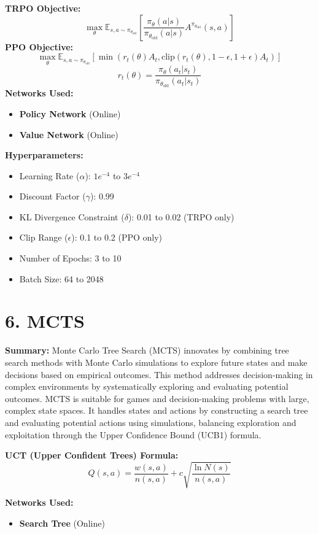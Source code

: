 \documentclass[a4paper,10pt]{article}
\begin{document}
\begin{multicols}{2}
\noindent \textbf{TRPO Objective:}
\[
\max_\theta \mathbb{E}_{s, a \sim \pi_{\theta_{\text{old}}}} \left[ \frac{\pi_\theta(a|s)}{\pi_{\theta_{\text{old}}}(a|s)} A^{\pi_{\theta_{\text{old}}}}(s, a) \right]
\]
\textbf{PPO Objective:}
\[
\max_\theta \mathbb{E}_{s, a \sim \pi_{\theta_{\text{old}}}} \left[ \min\left( r_t(\theta) A_t, \text{clip}(r_t(\theta), 1-\epsilon, 1+\epsilon) A_t \right) \right]
\]
\[
r_t(\theta) = \frac{\pi_\theta(a_t | s_t)}{\pi_{\theta_{\text{old}}}(a_t | s_t)}
\]
\textbf{Networks Used:}
\begin{itemize}
    \item \textbf{Policy Network} (Online)
    \item \textbf{Value Network} (Online)
\end{itemize}
\textbf{Hyperparameters:}
\begin{itemize}
    \item Learning Rate (\(\alpha\)): \(1e^{-4}\) to \(3e^{-4}\)
    \item Discount Factor (\(\gamma\)): 0.99
    \item KL Divergence Constraint (\(\delta\)): 0.01 to 0.02 (TRPO only)
    \item Clip Range (\(\epsilon\)): 0.1 to 0.2 (PPO only)
    \item Number of Epochs: 3 to 10
    \item Batch Size: 64 to 2048
\end{itemize}

\section*{6. MCTS}
\textbf{Summary:} Monte Carlo Tree Search (MCTS) innovates by combining tree search methods with Monte Carlo simulations to explore future states and make decisions based on empirical outcomes. This method addresses decision-making in complex environments by systematically exploring and evaluating potential outcomes. MCTS is suitable for games and decision-making problems with large, complex state spaces. It handles states and actions by constructing a search tree and evaluating potential actions using simulations, balancing exploration and exploitation through the Upper Confidence Bound (UCB1) formula.

\noindent \textbf{UCT (Upper Confident Trees) Formula:}
\[
Q(s, a) = \frac{w(s, a)}{n(s, a)} + c \sqrt{\frac{\ln N(s)}{n(s, a)}}
\]

\noindent \textbf{Networks Used:}
\begin{itemize}
    \item \textbf{Search Tree} (Online)
\end{itemize}


\end{multicols}
\end{document}
